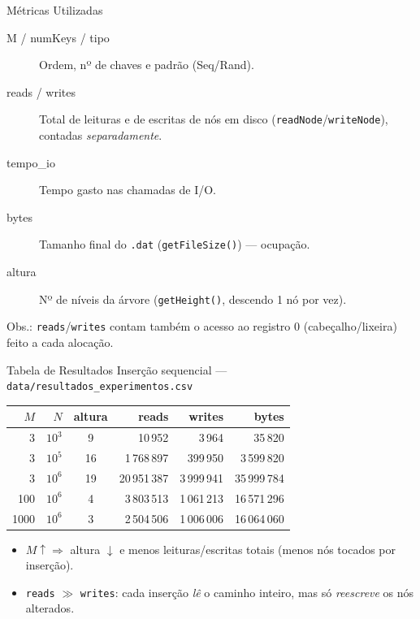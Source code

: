 \documentclass[aspectratio=169,11pt]{beamer}
\begin{document}
\begin{frame}{Métricas Utilizadas}
  \begin{description}
    \item[M / numKeys / tipo] Ordem, nº de chaves e padrão (Seq/Rand).
    \item[reads / writes] Total de \alert{leituras} e de \alert{escritas} de nós em
      disco (\texttt{readNode}/\texttt{writeNode}), contadas \emph{separadamente}.
    \item[tempo\_io] Tempo gasto nas chamadas de I/O.
    \item[bytes] Tamanho final do \texttt{.dat} (\texttt{getFileSize()}) --- ocupação.
    \item[altura] Nº de níveis da árvore (\texttt{getHeight()}, descendo 1 nó por vez).
  \end{description}
  \footnotesize\color{btgray} Obs.: \texttt{reads}/\texttt{writes} contam também o
  acesso ao registro 0 (cabeçalho/lixeira) feito a cada alocação.
\end{frame}

\begin{frame}{Tabela de Resultados}
  \centering\footnotesize
  Inserção sequencial --- \texttt{data/resultados\_experimentos.csv}
  \vspace{0.4em}
  \begin{tabular}{r r c r r r}
    \toprule
    $M$ & $N$ & altura & reads & writes & bytes \\
    \midrule
    3    & $10^3$ & 9  & 10\,952      & 3\,964      & 35\,820 \\
    3    & $10^5$ & 16 & 1\,768\,897  & 399\,950    & 3\,599\,820 \\
    3    & $10^6$ & 19 & 20\,951\,387 & 3\,999\,941 & 35\,999\,784 \\
    100  & $10^6$ & 4  & 3\,803\,513  & 1\,061\,213 & 16\,571\,296 \\
    1000 & $10^6$ & 3  & 2\,504\,506  & 1\,006\,006 & 16\,064\,060 \\
    \bottomrule
  \end{tabular}
  \vspace{0.6em}
  \begin{itemize}\footnotesize
    \item $M\!\uparrow \Rightarrow$ \alert{altura $\downarrow$} e \alert{menos
      leituras/escritas totais} (menos nós tocados por inserção).
    \item \texttt{reads} $\gg$ \texttt{writes}: cada inserção \emph{lê} o caminho
      inteiro, mas só \emph{reescreve} os nós alterados.
  \end{itemize}
\end{frame}
\end{document}
